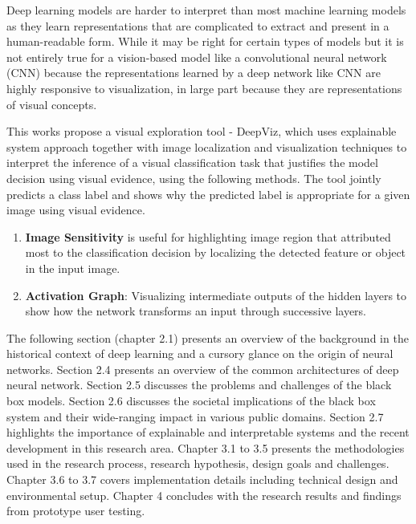 Deep learning models are harder to interpret than most machine learning models as they learn representations that are complicated to extract and present in a human-readable form.  While it may be right for certain types of models but it is not entirely true for a vision-based model like a convolutional neural network (CNN) because the representations learned by a deep network like CNN are highly responsive to visualization, in large part because they are representations of visual concepts. 

This works propose a visual exploration tool - DeepViz, which uses explainable system approach together with image localization and visualization techniques to interpret the inference of a visual classification task that justifies the model decision using visual evidence, using the following methods. The tool jointly predicts a class label and shows why the predicted label is appropriate for a given image using visual evidence.

\begin{enumerate}
\item \textbf{Image Sensitivity} is useful for highlighting image region that attributed most to the classification decision by localizing the detected feature or object in the input image.


\item  \textbf{Activation Graph}: Visualizing intermediate outputs of the hidden layers to show how the network transforms an input through successive layers.

\end{enumerate}

The following section (chapter 2.1) presents an overview of the background in the historical context of deep learning and a cursory glance on the origin of neural networks. Section 2.4 presents an overview of the common architectures of deep neural network. Section 2.5 discusses the problems and challenges of the black box models. Section 2.6 discusses the societal implications of the black box system and their wide-ranging impact in various public domains. Section 2.7 highlights the importance of explainable and interpretable systems and the recent development in this research area. Chapter 3.1 to 3.5 presents the methodologies used in the research process, research hypothesis, design goals and challenges. Chapter 3.6 to 3.7 covers implementation details including technical design and environmental setup. Chapter 4 concludes with the research results and findings from prototype user testing.


\iffalse %
\fi %